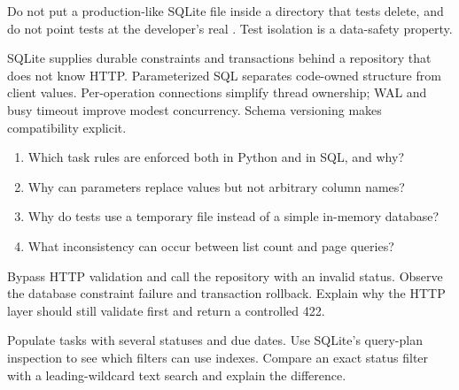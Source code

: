 \begin{pitfall}
Do not put a production-like SQLite file inside a directory that tests delete,
and do not point tests at the developer's real . Test isolation
is a data-safety property.
\end{pitfall}

\summarytitle

SQLite supplies durable constraints and transactions behind a repository that
does not know HTTP. Parameterized SQL separates code-owned structure from client
values. Per-operation connections simplify thread ownership; WAL and busy timeout
improve modest concurrency. Schema versioning makes compatibility explicit.

\reviewtitle
\begin{enumerate}
  \item Which task rules are enforced both in Python and in SQL, and why?
  \item Why can parameters replace values but not arbitrary column names?
  \item Why do tests use a temporary file instead of a simple in-memory database?
  \item What inconsistency can occur between list count and page queries?
\end{enumerate}

\begin{exercise}
Bypass HTTP validation and call the repository with an invalid status. Observe
the database constraint failure and transaction rollback. Explain why the HTTP
layer should still validate first and return a controlled 422.
\end{exercise}

\begin{exercise}
Populate tasks with several statuses and due dates. Use SQLite's query-plan
inspection to see which filters can use indexes. Compare an exact status filter
with a leading-wildcard text search and explain the difference.
\end{exercise}

